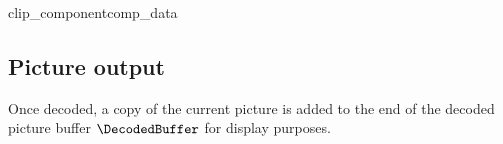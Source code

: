 \begin{pseudo}{clip\_component}{comp\_data}
     \bsEND
\bsEND
\end{pseudo}

\subsection{Picture output}
\label{picoutput}

Once decoded, a copy of the current picture is added to the end of the decoded picture buffer
$\DecodedBuffer$ for display purposes.
